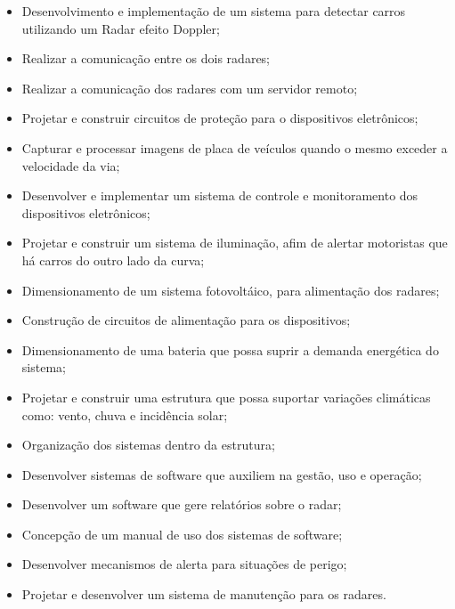  \begin{itemize}
   \item Desenvolvimento e implementação de um sistema para detectar carros utilizando um Radar efeito Doppler;
   \item Realizar a comunicação entre os dois radares;
   \item Realizar a comunicação dos radares com um servidor remoto;
   \item Projetar e construir circuitos de proteção para o dispositivos eletrônicos;
   \item Capturar e processar imagens de placa de veículos quando o mesmo exceder a velocidade da via;
   \item Desenvolver e implementar um sistema de controle e monitoramento dos dispositivos eletrônicos;
   \item Projetar e construir um sistema de iluminação, afim de alertar motoristas que há carros do outro lado da curva;
   \item Dimensionamento de um sistema fotovoltáico, para alimentação dos radares;
   \item Construção de circuitos de alimentação para os dispositivos;
   \item Dimensionamento de uma bateria que possa suprir a demanda energética do sistema;
   \item Projetar e construir uma estrutura que possa suportar variações climáticas como: vento, chuva e incidência solar;
   \item Organização dos sistemas dentro da estrutura;
   \item Desenvolver sistemas de software que auxiliem na gestão, uso e operação;
   \item Desenvolver um software que gere relatórios sobre o radar;
   \item Concepção de um manual de uso dos sistemas de software;
   \item Desenvolver mecanismos de alerta para situações de perigo;
   \item Projetar e desenvolver um sistema de manutenção para os radares.
   
 \end{itemize}